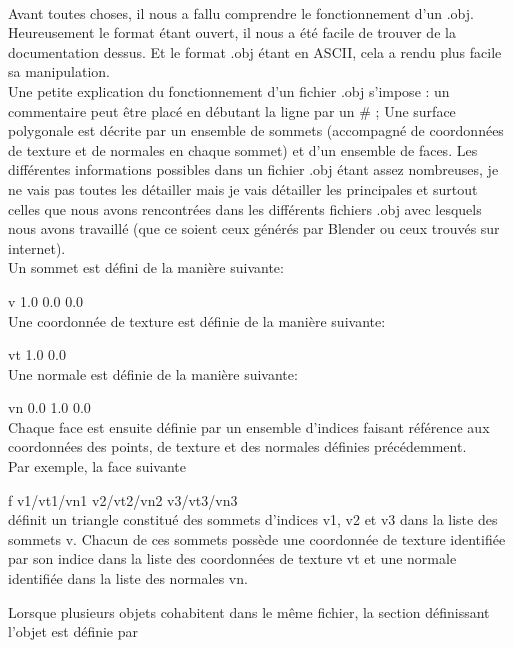 \documentclass{report}
\begin{document}
				\paragraph{}
					Avant toutes choses, il nous a fallu comprendre le fonctionnement d'un .obj. Heureusement le format étant ouvert, il nous a été facile de trouver de la documentation dessus. Et le format .obj étant en ASCII, cela a rendu plus facile sa manipulation. \\
Une petite explication du fonctionnement d'un fichier .obj s'impose : un commentaire peut être placé en débutant la ligne par un \# ; Une surface polygonale est décrite par un ensemble de sommets (accompagné de coordonnées de texture et de normales en chaque sommet) et d'un ensemble de faces. Les différentes informations possibles dans un fichier .obj étant assez nombreuses, je ne vais pas toutes les détailler mais je vais détailler les principales et surtout celles que nous avons rencontrées dans les différents fichiers .obj avec lesquels nous avons travaillé (que ce soient ceux générés par Blender ou ceux trouvés sur internet). \\

Un sommet est défini de la manière suivante:

	v 1.0 0.0 0.0 \\

Une coordonnée de texture est définie de la manière suivante:

	vt 1.0 0.0\\


Une normale est définie de la manière suivante:

	vn 0.0 1.0 0.0\\


Chaque face est ensuite définie par un ensemble d'indices faisant référence aux coordonnées des points, de texture et des normales définies précédemment.\\

Par exemple, la face suivante

	f v1/vt1/vn1 v2/vt2/vn2 v3/vt3/vn3\\

définit un triangle constitué des sommets d'indices v1, v2 et v3 dans la liste des sommets v. Chacun de ces sommets possède une coordonnée de texture identifiée par son indice dans la liste des coordonnées de texture vt et une normale identifiée dans la liste des normales vn.

\newpage

Lorsque plusieurs objets cohabitent dans le même fichier, la section définissant l'objet est définie par
\end{document}
